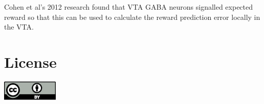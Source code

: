 \documentclass[12pt,a4paper]{article}
\let\oldsection\section
\renewcommand\section{\clearpage\oldsection}
\begin{document}
Cohen et al’s 2012 research found that VTA GABA neurons signalled expected reward \citep{Cohen2012} so that this can be used to calculate the reward prediction error locally in the VTA.


\appendix

\section{License}



\includegraphics[width=0.2\textwidth]{by.eps}





\end{document}
